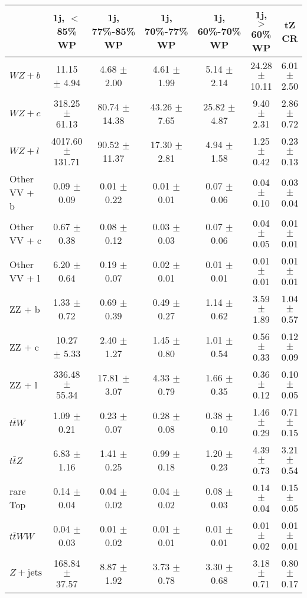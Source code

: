 \begin{tabular}{|l|c|c|c|c|c|c|}
\hline 
 & {1j, $<$85\% WP} & {1j, 77\%-85\% WP} & {1j, 70\%-77\% WP} & {1j, 60\%-70\% WP} & {1j, $>$60\% WP} & {tZ CR}\\
\hline 
  $WZ + b$   & 11.15 $\pm$ 4.94 & 4.68 $\pm$ 2.00 & 4.61 $\pm$ 1.99 & 5.14 $\pm$ 2.14 & 24.28 $\pm$ 10.11 & 6.01 $\pm$ 2.50 \\ 
  $WZ + c$   & 318.25 $\pm$ 61.13 & 80.74 $\pm$ 14.38 & 43.26 $\pm$ 7.65 & 25.82 $\pm$ 4.87 & 9.40 $\pm$ 2.31 & 2.86 $\pm$ 0.72 \\ 
  $WZ + l$   & 4017.60 $\pm$ 131.71 & 90.52 $\pm$ 11.37 & 17.30 $\pm$ 2.81 & 4.94 $\pm$ 1.58 & 1.25 $\pm$ 0.42 & 0.23 $\pm$ 0.13 \\ 
  Other VV + b   & 0.09 $\pm$ 0.09 & 0.01 $\pm$ 0.22 & 0.01 $\pm$ 0.01 & 0.07 $\pm$ 0.06 & 0.04 $\pm$ 0.10 & 0.03 $\pm$ 0.04 \\ 
  Other VV + c   & 0.67 $\pm$ 0.38 & 0.08 $\pm$ 0.12 & 0.03 $\pm$ 0.03 & 0.07 $\pm$ 0.06 & 0.04 $\pm$ 0.05 & 0.01 $\pm$ 0.01 \\ 
  Other VV + l   & 6.20 $\pm$ 0.64 & 0.19 $\pm$ 0.07 & 0.02 $\pm$ 0.01 & 0.01 $\pm$ 0.01 & 0.01 $\pm$ 0.01 & 0.01 $\pm$ 0.01 \\ 
  ZZ + b   & 1.33 $\pm$ 0.72 & 0.69 $\pm$ 0.39 & 0.49 $\pm$ 0.27 & 1.14 $\pm$ 0.62 & 3.59 $\pm$ 1.89 & 1.04 $\pm$ 0.57 \\ 
  ZZ + c   & 10.27 $\pm$ 5.33 & 2.40 $\pm$ 1.27 & 1.45 $\pm$ 0.80 & 1.01 $\pm$ 0.54 & 0.56 $\pm$ 0.33 & 0.12 $\pm$ 0.09 \\ 
  ZZ + l  & 336.48 $\pm$ 55.34 & 17.81 $\pm$ 3.07 & 4.33 $\pm$ 0.79 & 1.66 $\pm$ 0.35 & 0.36 $\pm$ 0.12 & 0.10 $\pm$ 0.05 \\ 
  $t\bar{t}W$   & 1.09 $\pm$ 0.21 & 0.23 $\pm$ 0.07 & 0.28 $\pm$ 0.08 & 0.38 $\pm$ 0.10 & 1.46 $\pm$ 0.29 & 0.71 $\pm$ 0.15 \\ 
  $t\bar{t}Z$   & 6.83 $\pm$ 1.16 & 1.41 $\pm$ 0.25 & 0.99 $\pm$ 0.18 & 1.20 $\pm$ 0.23 & 4.39 $\pm$ 0.73 & 3.21 $\pm$ 0.54 \\ 
  rare Top   & 0.14 $\pm$ 0.04 & 0.04 $\pm$ 0.02 & 0.04 $\pm$ 0.02 & 0.08 $\pm$ 0.03 & 0.14 $\pm$ 0.04 & 0.15 $\pm$ 0.05 \\ 
  $t\bar{t}WW$   & 0.04 $\pm$ 0.03 & 0.01 $\pm$ 0.02 & 0.01 $\pm$ 0.01 & 0.01 $\pm$ 0.01 & 0.01 $\pm$ 0.02 & 0.01 $\pm$ 0.01 \\ 
  $Z+\text{jets}$   & 168.84 $\pm$ 37.57 & 8.87 $\pm$ 1.92 & 3.73 $\pm$ 0.78 & 3.30 $\pm$ 0.68 & 3.18 $\pm$ 0.71 & 0.80 $\pm$ 0.17 \\ 

\end{tabular}
